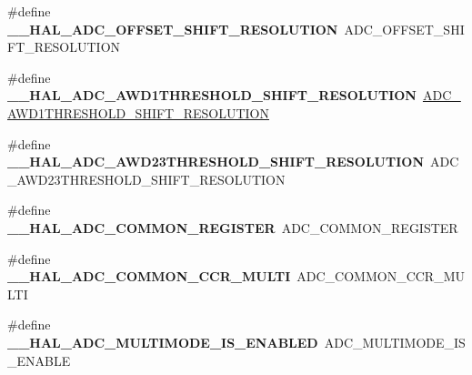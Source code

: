 \begin{DoxyCompactItemize}
\#define {\bfseries \+\_\+\+\_\+\+H\+A\+L\+\_\+\+A\+D\+C\+\_\+\+O\+F\+F\+S\+E\+T\+\_\+\+S\+H\+I\+F\+T\+\_\+\+R\+E\+S\+O\+L\+U\+T\+I\+ON}~A\+D\+C\+\_\+\+O\+F\+F\+S\+E\+T\+\_\+\+S\+H\+I\+F\+T\+\_\+\+R\+E\+S\+O\+L\+U\+T\+I\+ON
\item 
\mbox{\label{group___h_a_l___a_d_c___aliased___macros_ga616002cefa3a1ba7af4fa612afd02561}} 
\#define {\bfseries \+\_\+\+\_\+\+H\+A\+L\+\_\+\+A\+D\+C\+\_\+\+A\+W\+D1\+T\+H\+R\+E\+S\+H\+O\+L\+D\+\_\+\+S\+H\+I\+F\+T\+\_\+\+R\+E\+S\+O\+L\+U\+T\+I\+ON}~\hyperlink{group___a_d_c___private___macros_ga6964dd348041232d34696fd535ad4450}{A\+D\+C\+\_\+\+A\+W\+D1\+T\+H\+R\+E\+S\+H\+O\+L\+D\+\_\+\+S\+H\+I\+F\+T\+\_\+\+R\+E\+S\+O\+L\+U\+T\+I\+ON}
\item 
\mbox{\label{group___h_a_l___a_d_c___aliased___macros_ga4038d6abc1b95e035a2a0b51fb999db2}} 
\#define {\bfseries \+\_\+\+\_\+\+H\+A\+L\+\_\+\+A\+D\+C\+\_\+\+A\+W\+D23\+T\+H\+R\+E\+S\+H\+O\+L\+D\+\_\+\+S\+H\+I\+F\+T\+\_\+\+R\+E\+S\+O\+L\+U\+T\+I\+ON}~A\+D\+C\+\_\+\+A\+W\+D23\+T\+H\+R\+E\+S\+H\+O\+L\+D\+\_\+\+S\+H\+I\+F\+T\+\_\+\+R\+E\+S\+O\+L\+U\+T\+I\+ON
\item 
\mbox{\label{group___h_a_l___a_d_c___aliased___macros_ga00ebbedf4015e4538720e7a6dbacce59}} 
\#define {\bfseries \+\_\+\+\_\+\+H\+A\+L\+\_\+\+A\+D\+C\+\_\+\+C\+O\+M\+M\+O\+N\+\_\+\+R\+E\+G\+I\+S\+T\+ER}~A\+D\+C\+\_\+\+C\+O\+M\+M\+O\+N\+\_\+\+R\+E\+G\+I\+S\+T\+ER
\item 
\mbox{\label{group___h_a_l___a_d_c___aliased___macros_ga8bf50f7c58849d4cd141a421d55b148d}} 
\#define {\bfseries \+\_\+\+\_\+\+H\+A\+L\+\_\+\+A\+D\+C\+\_\+\+C\+O\+M\+M\+O\+N\+\_\+\+C\+C\+R\+\_\+\+M\+U\+L\+TI}~A\+D\+C\+\_\+\+C\+O\+M\+M\+O\+N\+\_\+\+C\+C\+R\+\_\+\+M\+U\+L\+TI
\item 
\mbox{\label{group___h_a_l___a_d_c___aliased___macros_ga79f75f2e379c482c38441c050efc7225}} 
\#define {\bfseries \+\_\+\+\_\+\+H\+A\+L\+\_\+\+A\+D\+C\+\_\+\+M\+U\+L\+T\+I\+M\+O\+D\+E\+\_\+\+I\+S\+\_\+\+E\+N\+A\+B\+L\+ED}~A\+D\+C\+\_\+\+M\+U\+L\+T\+I\+M\+O\+D\+E\+\_\+\+I\+S\+\_\+\+E\+N\+A\+B\+LE
\item 
\mbox{\label{group___h_a_l___a_d_c___aliased___macros_gaa5b9fcac48711d597023aecdb11afc51}} 

\end{DoxyCompactItemize}
